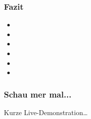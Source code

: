 \documentclass[12pt,ngerman]{beamer}
\begin{document}
\begin{frame}
\frametitle{Fazit}

\begin{itemize}
\item
\item
\item
\item
\item
\item
\end{itemize}
\end{frame}


\begin{frame}
\frametitle{Schau mer mal...}

Kurze Live-Demonstration\ldots
\end{frame}
\end{document}
